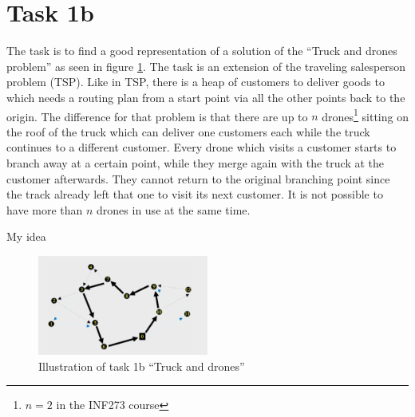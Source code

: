 \documentclass[a4paper,11pt]{article}
\theoremstyle{mytheor}
\begin{document}
\section*{Task 1b}
The task is to find a good representation of a solution of the \enquote{Truck and drones problem} as seen in figure \ref{fig:task1b}. The task is an extension of the traveling salesperson problem (TSP). Like in TSP, there is a heap of customers to deliver goods to which needs a routing plan from a start point via all the other points back to the origin. The difference for that problem is that there are up to $n$ drones\footnote{$n=2$ in the INF273 course} sitting on the roof of the truck which can deliver one customers each while the truck continues to a different customer. Every drone which visits a customer starts to branch away at a certain point, while they merge again with the truck at the customer afterwards. They cannot return to the original branching point since the track already left that one to visit its next customer. It is not possible to have more than $n$ drones in use at the same time.\medskip

My idea

\begin{figure}[h]
\centering
\includegraphics[width=0.5\textwidth]{task1b}
\caption{Illustration of task 1b \enquote{Truck and drones}}
\label{fig:task1b}
\end{figure}
\end{document}
